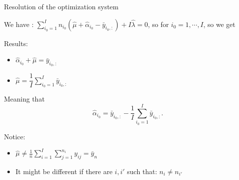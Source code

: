 \documentclass[unknownkeysallowed]{beamer}
\begin{document}
\begin{frame}{Resolution of the optimization system}

\vspace{0.5cm}
We have :  
$\sum\limits_{i_0 =1}^{I} n_{i_0}(\hat{\mu}+\hat{\alpha}_{i_0}-\bar{y}_{i_0,:}) +I\hat{\lambda}=0$, so for $i_0=1,\cdots,I$, so we get


\end{frame}




\begin{frame}

\begin{alertblock}{Results: }
    \begin{itemize}
        \item $\hat{\alpha}_{i_0} + \hat{\mu}= \bar{y}_{i_0,:}$
        \item $\hat{\mu}=\dfrac{1}{I}\sum\limits_{i_0=1}^{I} \bar{y}_{i_0,:}$
    \end{itemize}

Meaning that 
\[\hat{\alpha}_{i_0}=\bar{y}_{i_0,:}-\frac{1}{I} \sum\limits_{i_0=1}^{I} \bar{y}_{i_0,:}.\]

\end{alertblock}

\begin{alertblock}{Notice: }
    \begin{itemize}
        \item $ \hat{\mu} \ne \frac{1}{n}\sum\limits_{i=1}^{I}\sum\limits_{j=1}^{n_i}y_{ij}=\bar{y}_n$
        \item It might be different if there are $ i,i'$ such that: $n_i \ne n_{i'}$
    \end{itemize}


\end{alertblock}
\end{frame}
\end{document}
